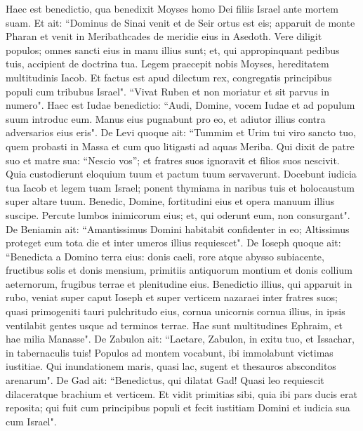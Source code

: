 \begin{biblechapter} 
\verse Haec est benedictio, qua benedixit Moyses homo Dei filiis Israel ante mortem suam.  
\verse Et ait: “Dominus de Sinai venit et de Seir ortus est eis; apparuit de monte Pharan et venit in Meribathcades de meridie eius in Asedoth. 
\verse Vere diligit populos; omnes sancti eius in manu illius sunt; et, qui appropinquant pedibus tuis, accipient de doctrina tua. 
\verse Legem praecepit nobis Moyses, hereditatem multitudinis Iacob. 
\verse Et factus est apud dilectum rex, congregatis principibus populi cum tribubus Israel". 
\verse “Vivat Ruben et non moriatur et sit parvus in numero". 
\verse Haec est Iudae benedictio: “Audi, Domine, vocem Iudae et ad populum suum introduc eum. Manus eius pugnabunt pro eo, et adiutor illius contra adversarios eius eris". 
\verse De Levi quoque ait: “Tummim et Urim tui viro sancto tuo, quem probasti in Massa et cum quo litigasti ad aquas Meriba. 
\verse Qui dixit de patre suo et matre sua: “Nescio vos”; et fratres suos ignoravit et filios suos nescivit. Quia custodierunt eloquium tuum et pactum tuum servaverunt. 
\verse Docebunt iudicia tua Iacob et legem tuam Israel; ponent thymiama in naribus tuis et holocaustum super altare tuum. 
\verse Benedic, Domine, fortitudini eius et opera manuum illius suscipe. Percute lumbos inimicorum eius; et, qui oderunt eum, non consurgant". 
\verse De Beniamin ait: “Amantissimus Domini habitabit confidenter in eo; Altissimus proteget eum tota die et inter umeros illius requiescet". 
\verse De Ioseph quoque ait: “Benedicta a Domino terra eius: donis caeli, rore atque abysso subiacente, 
\verse fructibus solis et donis mensium, 
\verse primitiis antiquorum montium et donis collium aeternorum, 
\verse frugibus terrae et plenitudine eius. Benedictio illius, qui apparuit in rubo, veniat super caput Ioseph et super verticem nazaraei inter fratres suos; 
\verse quasi primogeniti tauri pulchritudo eius, cornua unicornis cornua illius, in ipsis ventilabit gentes usque ad terminos terrae. Hae sunt multitudines Ephraim, et hae milia Manasse". 
\verse De Zabulon ait: “Laetare, Zabulon, in exitu tuo, et Issachar, in tabernaculis tuis! 
\verse Populos ad montem vocabunt, ibi immolabunt victimas iustitiae. Qui inundationem maris, quasi lac, sugent et thesauros absconditos arenarum". 
\verse De Gad ait: “Benedictus, qui dilatat Gad! Quasi leo requiescit dilaceratque brachium et verticem. 
\verse Et vidit primitias sibi, quia ibi pars ducis erat reposita; qui fuit cum principibus populi et fecit iustitiam Domini et iudicia sua cum Israel". 

\end{biblechapter}
